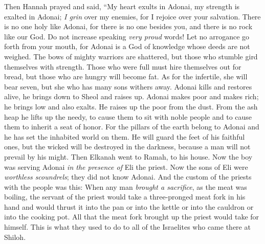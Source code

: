 \begin{biblechapter} %
\verse Then Hannah prayed and said,
\verse “My heart exults in Adonai, my strength is exalted in Adonai; \textit{I grin} over my enemies, for I rejoice over your salvation.
\verse There is no one holy like Adonai, for there is no one besides you, 
and there is no rock like our God.
\verse Do not increase speaking \textit{very proud} words! 
Let no arrogance go forth from your mouth, 
for Adonai is a God of knowledge 
whose deeds are not weighed.
\verse The bows of mighty warriors are shattered, 
but those who stumble gird themselves with strength.
\verse Those who were full must hire themselves out for bread, 
but those who are hungry will become fat. 
As for the infertile, she will bear seven, 
but she who has many sons withers away.
\verse Adonai kills and restores alive, 
he brings down to Sheol and raises up.
\verse Adonai makes poor and makes rich; 
he brings low and also exalts.
\verse He raises up the poor from the dust. 
From the ash heap he lifts up the needy, 
to cause them to sit with noble people 
and to cause them to inherit a seat of honor. 
For the pillars of the earth belong to Adonai 
and he has set the inhabited world on them.
\verse He will guard the feet of his faithful ones, 
but the wicked will be destroyed in the darkness, 
because a man will not prevail by his might.
\verse Then Elkanah went to Ramah, to his house. Now the boy was serving Adonai \textit{in the presence of} Eli the priest.
 Now the sons of Eli were \textit{worthless scoundrels}; they did not know Adonai.
\verse And the custom of the priests with the people was this: When any man \textit{brought a sacrifice}, as the meat was boiling, the servant of the priest would take a three-pronged meat fork in his hand
\verse and would thrust it into the pan or into the kettle or into the cauldron or into the cooking pot. All that the meat fork brought up the priest would take for himself. This is what they used to do to all of the Israelites who came there at Shiloh.

\end{biblechapter}

